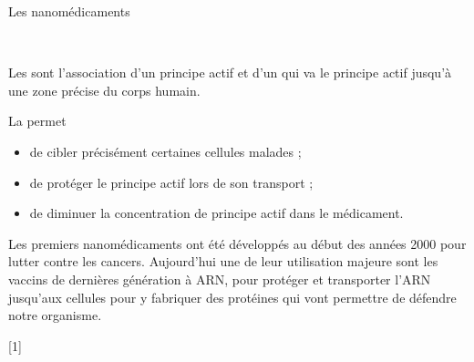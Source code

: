 \begin{doc}{Les nanomédicaments}
  \begin{figure}
    \vspace*{-20pt}
    \begin{center}
       \\
    \end{center}
  \end{figure}

  Les  sont l'association d'un principe actif et d'un  qui va  le principe actif jusqu'à une zone précise du corps humain.

  \begin{importants}
    La  permet
    \begin{itemize}[label=\pointCyan, leftmargin=*]
      \item de cibler précisément certaines cellules malades ;
      \item de protéger le principe actif lors de son transport ;
      \item de diminuer la concentration de principe actif dans le médicament.
    \end{itemize}
  \end{importants}

  Les premiers nanomédicaments ont été développés au début des années 2000 pour lutter contre les cancers.
  Aujourd'hui une de leur utilisation majeure sont les vaccins de dernières génération à ARN, pour protéger et transporter l'ARN jusqu'aux cellules pour y fabriquer des protéines qui vont permettre de défendre notre organisme.
\end{doc}

[1]